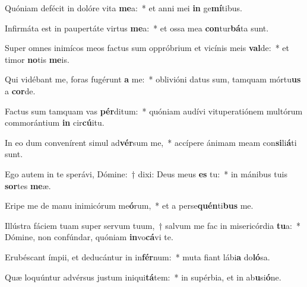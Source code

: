\item Quóniam defécit in dolóre vita \textbf{me}a:~* et anni mei \textbf{in} ge\textbf{mí}tibus.
\item Infirmáta est in paupertáte virtus \textbf{me}a:~* et ossa mea \textbf{con}tur\textbf{bá}ta sunt.
\item Super omnes inimícos meos factus sum oppróbrium et vicínis meis \textbf{val}de:~* et timor \textbf{no}tis \textbf{me}is.
\item Qui vidébant me, foras fugérunt \textbf{a} me:~* oblivióni datus sum, tamquam mórtu\textbf{us} a \textbf{cor}de.
\item Factus sum tamquam vas \textbf{pér}ditum:~* quóniam audívi vituperatiónem multórum commorántium \textbf{in} cir\textbf{cú}itu.
\item In eo dum convenírent simul ad\textbf{vér}sum me,~* accípere ánimam meam con\textbf{si}li\textbf{á}ti sunt.
\item Ego autem in te sperávi, Dómine:~† dixi: Deus meus \textbf{es} tu:~* in mánibus tuis \textbf{sor}tes \textbf{me}æ.
\item Eripe me de manu inimicórum me\textbf{ó}rum,~* et a perse\textbf{quén}ti\textbf{bus} me.
\item Illústra fáciem tuam super servum tuum,~† salvum me fac in misericórdia \textbf{tu}a:~* Dómine, non confúndar, quóniam \textbf{in}vo\textbf{cá}vi te.
\item Erubéscant ímpii, et deducántur in in\textbf{fér}num:~* muta fiant lábi\textbf{a} do\textbf{ló}sa.
\item Quæ loquúntur advérsus justum iniqui\textbf{tá}tem:~* in supérbia, et in ab\textbf{u}si\textbf{ó}ne.
